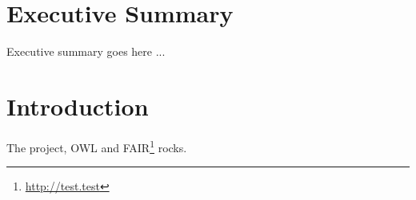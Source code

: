 
\section*{Executive Summary}
Executive summary goes here ...

\clearpage

\tableofcontents

\clearpage

\section{Introduction} \label{sec:intro}

The \raki project, \ac{OWL} and FAIR\footnote{\url{http://test.test}}\cite{FAIR} rocks.
